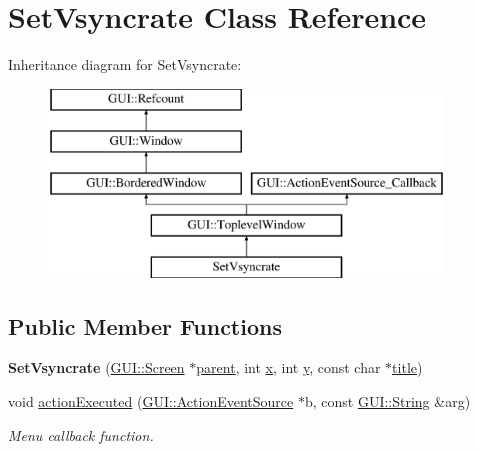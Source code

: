 \hypertarget{classSetVsyncrate}{\section{Set\-Vsyncrate Class Reference}
\label{classSetVsyncrate}
}
Inheritance diagram for Set\-Vsyncrate\-:\begin{figure}[H]
\begin{center}
\leavevmode
\includegraphics[height=5.000000cm]{classSetVsyncrate}
\end{center}
\end{figure}
\subsection*{Public Member Functions}
\begin{DoxyCompactItemize}
\item 
\hypertarget{classSetVsyncrate_a027bc635d352fdd95dfbcd6c8a6b6774}{{\bfseries Set\-Vsyncrate} (\hyperlink{classGUI_1_1Screen}{G\-U\-I\-::\-Screen} $\ast$\hyperlink{classGUI_1_1Window_a2e593ff65e7702178d82fe9010a0b539}{parent}, int \hyperlink{classGUI_1_1Window_a6ca6a80ca00c9e1d8ceea8d3d99a657d}{x}, int \hyperlink{classGUI_1_1Window_a0ee8e923aff2c3661fc2e17656d37adf}{y}, const char $\ast$\hyperlink{classGUI_1_1ToplevelWindow_a04de191f9a57b5b584657866a4ac6843}{title})}\label{classSetVsyncrate_a027bc635d352fdd95dfbcd6c8a6b6774}

\item 
\hypertarget{classSetVsyncrate_a7cb5a521b9e9c28bfc78d0820a2901a3}{void \hyperlink{classSetVsyncrate_a7cb5a521b9e9c28bfc78d0820a2901a3}{action\-Executed} (\hyperlink{classGUI_1_1ActionEventSource}{G\-U\-I\-::\-Action\-Event\-Source} $\ast$b, const \hyperlink{classGUI_1_1String}{G\-U\-I\-::\-String} \&arg)}\label{classSetVsyncrate_a7cb5a521b9e9c28bfc78d0820a2901a3}

\begin{DoxyCompactList}\small\item\em Menu callback function. \end{DoxyCompactList}\end{DoxyCompactItemize}
